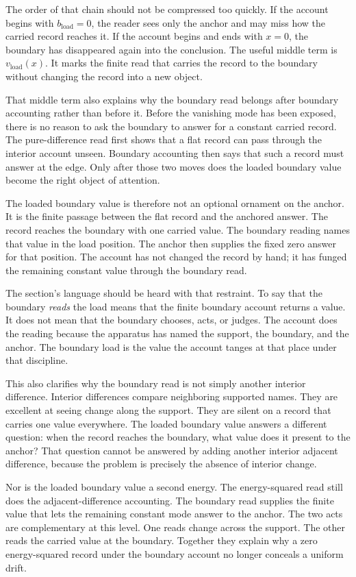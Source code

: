 The order of that chain should not be compressed too quickly. If the account
begins with \(b_{\mathrm{load}}=0\), the reader sees only the anchor and may
miss how the carried record reaches it. If the account begins and ends with
\(x=0\), the boundary has disappeared again into the conclusion. The useful
middle term is \(v_{\mathrm{load}}(x)\). It marks the finite read that carries
the record to the boundary without changing the record into a new object.

That middle term also explains why the boundary read belongs after boundary
accounting rather than before it. Before the vanishing mode has been exposed,
there is no reason to ask the boundary to answer for a constant carried record.
The pure-difference read first shows that a flat record can pass through the
interior account unseen. Boundary accounting then says that such a record must
answer at the edge. Only after those two moves does the loaded boundary value
become the right object of attention.

The loaded boundary value is therefore not an optional ornament on the anchor.
It is the finite passage between the flat record and the anchored answer. The
record reaches the boundary with one carried value. The boundary reading names
that value in the load position. The anchor then supplies the fixed zero answer
for that position. The account has not changed the record by hand; it has
funged the remaining constant value through the boundary read.

The section's language should be heard with that restraint. To say that the
boundary \emph{reads} the load means that the finite boundary account returns a
value. It does not mean that the boundary chooses, acts, or judges. The account
does the reading because the apparatus has named the support, the boundary, and
the anchor. The boundary load is the value the account tanges at that place
under that discipline.

This also clarifies why the boundary read is not simply another interior
difference. Interior differences compare neighboring supported names. They
are excellent at seeing change along the support. They are silent on a record
that carries one value everywhere. The loaded boundary value answers a
different question: when the record reaches the boundary, what value does it
present to the anchor? That question cannot be answered by adding another
interior adjacent difference, because the problem is precisely the absence of
interior change.

Nor is the loaded boundary value a second energy. The energy-squared read
still does the adjacent-difference accounting. The boundary read supplies the
finite value that lets the remaining constant mode answer to the anchor. The
two acts are complementary at this level. One reads change across the support.
The other reads the carried value at the boundary. Together they explain why a
zero energy-squared record under the boundary account no longer conceals a
uniform drift.


